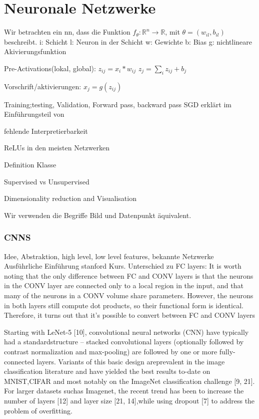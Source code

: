 \documentclass[twoside, 11pt,a4paper]{article}
\numberwithin{equation}{section}
\begin{document}
	\section{Neuronale Netzwerke} \label{chapter_nn}
	Wir betrachten ein \gls{nn}, dass die Funktion $f_{\theta}:\mathbb{R}^n \to\mathbb{R}$, mit $\theta = (w_{il}, b_{il})$ beschreibt. 
	i: Schicht
	l: Neuron in der Schicht
	w: Gewichte 
	b: Bias
	g: nichtlineare Akivierungsfunktion
	
	Pre-Activations(lokal, global): $z_{ij} = x_i*w_{ij}$
	$z_j = \sum_iz_{ij} + b_j$
	
	Vorschrift/aktivierungen: $x_j = g(z_{ij})$
	
	
	Training;testing, Validation, Forward pass, backward pass
	SGD erklärt im Einführungsteil von \cite{BatchNormalization}
	
	fehlende Interpretierbarkeit
	
	ReLUs in den meisten Netzwerken
	
	Definition Klasse
	
	Supervised vs Unsupervised
	
	Dimensionality reduction and Visualisation
	
	Wir verwenden die Begriffe Bild und Datenpunkt äquivalent.
	\subsubsection{CNNS}
	Idee, Abstraktion, high level, low level features, bekannte Netzwerke\\
	
	Ausführliche Einführung stanford Kurs\cite{cnn_stanford}. Unterschied zu FC layers: 
	It is worth noting that the only difference between FC and CONV layers is that the neurons in the CONV layer are connected only to a local region in the input, and that many of the neurons in a CONV volume share parameters. However, the neurons in both layers still compute dot products, so their functional form is identical. Therefore, it turns out that it’s possible to convert between FC and CONV layers
	
	Starting with LeNet-5   [10], convolutional neural networks (CNN) have typically had a standardstructure – stacked convolutional layers (optionally followed by contrast normalization and max-pooling)  are  followed  by  one  or  more  fully-connected  layers.   Variants  of  this  basic  design  areprevalent in the image classification literature and have yielded the best results to-date on MNIST,CIFAR and most notably on the ImageNet classification challenge [9, 21].  For larger datasets suchas Imagenet, the recent trend has been to increase the number of layers  [12] and layer size [21, 14],while using dropout [7] to address the problem of overfitting.\cite{goingdeeperwithconvolutions}
	
\end{document}
